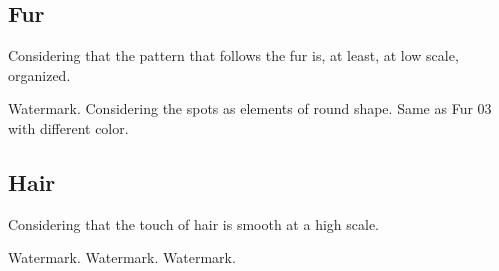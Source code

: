 \clearpage
\renewcommand{\matName}{Fur}
\subsection{\matName}
Considering that the pattern that follows the fur is, at least, at low scale, organized.

\renewcommand{\imgNumber}{01}
{Watermark.}{}
\renewcommand{\imgNumber}{02}
{}{}
\renewcommand{\imgNumber}{03}
{}{Considering the spots as elements of round shape.}
\renewcommand{\imgNumber}{04}
{}{}
\renewcommand{\imgNumber}{05}
{}{}
\renewcommand{\imgNumber}{06}
{}{}
\renewcommand{\imgNumber}{07}
{}{}
\renewcommand{\imgNumber}{08}
{}{}
\renewcommand{\imgNumber}{09}
{}{}
\renewcommand{\imgNumber}{10}
{}{}
\renewcommand{\imgNumber}{11}
{Same as Fur 03 with different color.}{}
\renewcommand{\imgNumber}{12}
{}{}

\clearpage
\renewcommand{\matName}{Hair}
\subsection{\matName}
Considering that the touch of hair is smooth at a high scale.

\renewcommand{\imgNumber}{01}
{Watermark.}{}
\renewcommand{\imgNumber}{02}
{Watermark.}{}
\renewcommand{\imgNumber}{03}
{}{}
\renewcommand{\imgNumber}{04}
{}{}
\renewcommand{\imgNumber}{05}
{}{}
\renewcommand{\imgNumber}{06}
{}{}
\renewcommand{\imgNumber}{07}
{}{}
\renewcommand{\imgNumber}{08}
{}{}
\renewcommand{\imgNumber}{09}
{}{}
\renewcommand{\imgNumber}{10}
{Watermark.}{}
\renewcommand{\imgNumber}{11}
{}{}
\renewcommand{\imgNumber}{12}
{}{}

